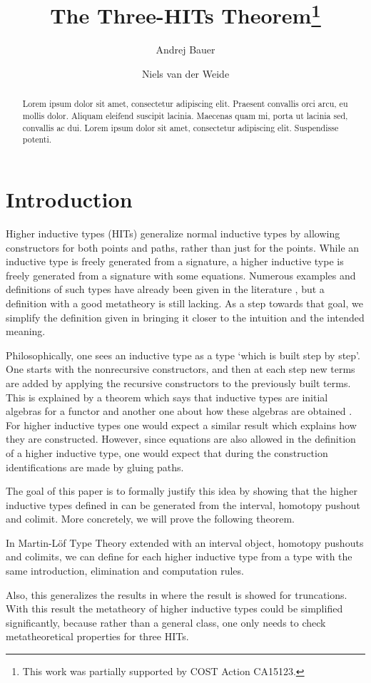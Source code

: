 \documentclass[a4paper,UKenglish]{lipics-v2016}
\title{The Three-HITs Theorem\footnote{This work was partially supported by COST Action CA15123.}}
\author[1]{Andrej Bauer}
\author[2]{Niels van der Weide}
\affil[1]{Department of Mathematics and Physics, University of Ljubljana, Ljubljana, Slovenia\\
  \texttt{Andrej.Bauer@andrej.com}}
\affil[2]{Department of Computer Science, Radboud University, Nijmegen, The Netherlands\\
  \texttt{nweide@cs.ru.nl}}
\begin{document}
\maketitle

\begin{abstract}
Lorem ipsum dolor sit amet, consectetur adipiscing elit. Praesent convallis orci arcu, eu mollis dolor. Aliquam eleifend suscipit lacinia. Maecenas quam mi, porta ut lacinia sed, convallis ac dui. Lorem ipsum dolor sit amet, consectetur adipiscing elit. Suspendisse potenti. 
 \end{abstract}

\section{Introduction}
Higher inductive types (HITs) generalize normal inductive types by allowing constructors for both points and paths, rather than just for the points.
While an inductive type is freely generated from a signature, a higher inductive type is freely generated from a signature with some equations.
Numerous examples and definitions of such types have already been given in the literature \cite{altenkirch2016quotient,awodey2012inductive,basoldhigher,sojakova2015higher,hottbook}, but a definition with a good metatheory is still lacking.
As a step towards that goal, we simplify the definition given in \cite{basoldhigher} bringing it closer to the intuition and the intended meaning.

Philosophically, one sees an inductive type as a type `which is built step by step'.
One starts with the nonrecursive constructors, and then at each step new terms are added by applying the recursive constructors to the previously built terms.
This is explained by a theorem which says that inductive types are initial algebras for a functor \cite{dybjer1994inductive,dybjer2003induction} and another one about how these algebras are obtained \cite{adamek1974free}.
For higher inductive types one would expect a similar result which explains how they are constructed.
However, since equations are also allowed in the definition of a higher inductive type, one would expect that during the construction identifications are made by gluing paths.

The goal of this paper is to formally justify this idea by showing that the higher inductive types defined in \cite{basoldhigher} can be generated from the interval, homotopy pushout and colimit.
More concretely, we will prove the following theorem.
\begin{theorem}
\label{thm:three-hit}
In Martin-L\"of Type Theory extended with an interval object, homotopy pushouts and colimits, we can define for each higher inductive type from \cite{basoldhigher} a type with the same introduction, elimination and computation rules.
\end{theorem}
Also, this generalizes the results in \cite{doorn2016constructing,kraus2014general,kraus2016constructions} where the result is showed for truncations.
With this result the metatheory of higher inductive types could be simplified significantly, because rather than a general class, one only needs to check metatheoretical properties for three HITs.
\end{document}
